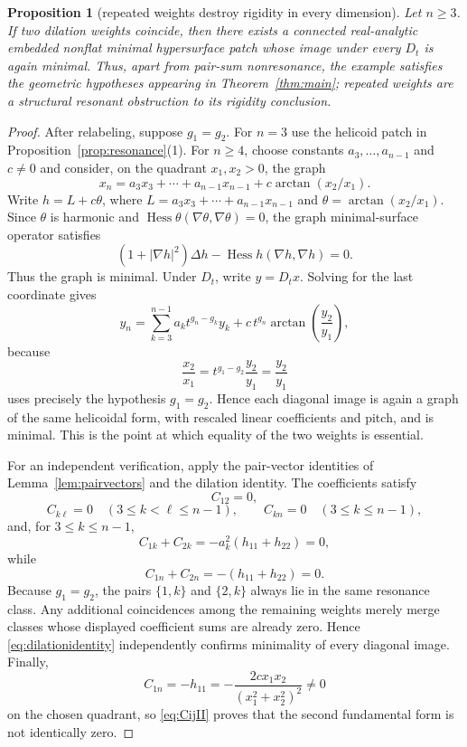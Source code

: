 \documentclass[preprint,12pt]{elsarticle}
\numberwithin{equation}{section}
\newtheorem{proposition}[theorem]{Proposition}
\theoremstyle{definition}\newtheorem{definition}[theorem]{Definition}
\theoremstyle{remark}\newtheorem{remark}[theorem]{Remark}
\begin{document}
\begin{proposition}[repeated weights destroy rigidity in every dimension]\label{prop:repeatedweights}
Let $n\ge3$. If two dilation weights coincide, then there exists a connected real-analytic embedded nonflat minimal hypersurface patch whose image under every $D_t$ is again minimal. Thus, apart from pair-sum nonresonance, the example satisfies the geometric hypotheses appearing in Theorem~\ref{thm:main}; repeated weights are a structural resonant obstruction to its rigidity conclusion.
\end{proposition}
\begin{proof}
After relabeling, suppose $g_1=g_2$. For $n=3$ use the helicoid patch in Proposition~\ref{prop:resonance}(1). For $n\ge4$, choose constants $a_3,\ldots,a_{n-1}$ and $c\ne0$ and consider, on the quadrant $x_1,x_2>0$, the graph
\begin{equation}\label{eq:shearedhelicoid}
x_n=a_3x_3+\cdots+a_{n-1}x_{n-1}+c\arctan(x_2/x_1).
\end{equation}
Write $h=L+c\theta$, where $L=a_3x_3+\cdots+a_{n-1}x_{n-1}$ and $\theta=\arctan(x_2/x_1)$. Since $\theta$ is harmonic and $\operatorname{Hess}\theta(\nabla\theta,\nabla\theta)=0$, the graph minimal-surface operator satisfies
\[
(1+|\nabla h|^2)\Delta h-\operatorname{Hess}h(\nabla h,\nabla h)=0.
\]
Thus the graph is minimal. Under $D_t$, write $y=D_tx$. Solving for the last coordinate gives
\[
y_n=\sum_{k=3}^{n-1}a_k t^{g_n-g_k}y_k+c\,t^{g_n}\arctan\!\left(\frac{y_2}{y_1}\right),
\]
because
\[
\frac{x_2}{x_1}=t^{g_1-g_2}\frac{y_2}{y_1}=\frac{y_2}{y_1}
\]
uses precisely the hypothesis $g_1=g_2$. Hence each diagonal image is again a graph of the same helicoidal form, with rescaled linear coefficients and pitch, and is minimal. This is the point at which equality of the two weights is essential.

For an independent verification, apply the pair-vector identities of Lemma~\ref{lem:pairvectors} and the dilation identity. The coefficients satisfy
\[
C_{12}=0,
\]
\[
C_{k\ell}=0\quad(3\le k<\ell\le n-1),\qquad
C_{kn}=0\quad(3\le k\le n-1),
\]
and, for $3\le k\le n-1$,
\[
C_{1k}+C_{2k}=-a_k^2(h_{11}+h_{22})=0,
\]
while
\[
C_{1n}+C_{2n}=-(h_{11}+h_{22})=0.
\]
Because $g_1=g_2$, the pairs $\{1,k\}$ and $\{2,k\}$ always lie in the same resonance class. Any additional coincidences among the remaining weights merely merge classes whose displayed coefficient sums are already zero. Hence \eqref{eq:dilationidentity} independently confirms minimality of every diagonal image. Finally,
\[
C_{1n}=-h_{11}=-\frac{2cx_1x_2}{(x_1^2+x_2^2)^2}\ne0
\]
on the chosen quadrant, so \eqref{eq:CijII} proves that the second fundamental form is not identically zero.
\end{proof}
\end{document}
